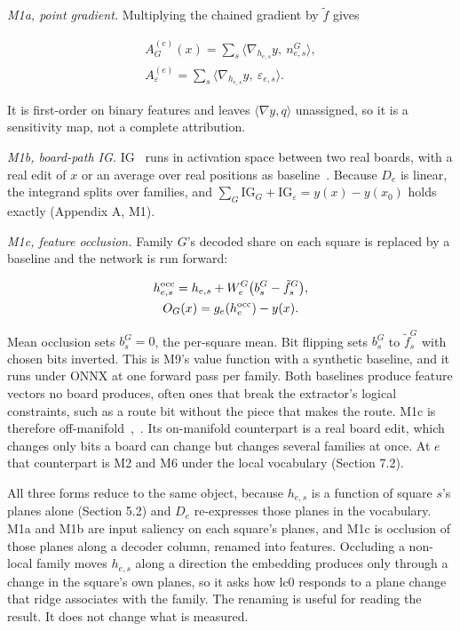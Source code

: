 \documentclass[conference]{IEEEtran}
\begin{document}
\emph{M1a, point gradient.} Multiplying the chained gradient by $\tilde f$ gives

\[
\begin{gathered}A^{(e)}_G(x)=\sum_s\big\langle\nabla_{h_{e,s}}y,\ n^G_{e,s}\big\rangle,\\
A^{(e)}_\varepsilon=\sum_s\big\langle\nabla_{h_{e,s}}y,\ \varepsilon_{e,s}\big\rangle.\end{gathered}
\]

It is first-order on binary features and leaves $\langle\nabla y,q\rangle$ unassigned, so it is a sensitivity map, not a complete attribution.

\emph{M1b, board-path IG.} IG~\cite{sundararajan2017} runs in activation space between two real boards, with a real edit of $x$ or an average over real positions as baseline~\cite{lundstrom2022}. Because $D_e$ is linear, the integrand splits over families, and $\sum_G\mathrm{IG}_G+\mathrm{IG}_\varepsilon=y(x)-y(x_0)$ holds exactly (Appendix A, M1).

\emph{M1c, feature occlusion.} Family $G$'s decoded share on each square is replaced by a baseline and the network is run forward:

\[
\begin{gathered}h^{\rm occ}_{e,s}=h_{e,s}+W^G_e\big(b^G_s-\tilde f^G_s\big),\\
O_G(x)=g_e(h^{\rm occ}_e)-y(x).\end{gathered}
\]

Mean occlusion sets $b^G_s=0$, the per-square mean. Bit flipping sets $b^G_s$ to $\tilde f^G_s$ with chosen bits inverted. This is M9's value function with a synthetic baseline, and it runs under ONNX at one forward pass per family. Both baselines produce feature vectors no board produces, often ones that break the extractor's logical constraints, such as a route bit without the piece that makes the route. M1c is therefore off-manifold~\cite{frye2021},~\cite{kumarIE2020}. Its on-manifold counterpart is a real board edit, which changes only bits a board can change but changes several families at once. At $e$ that counterpart is M2 and M6 under the local vocabulary (Section 7.2).

All three forms reduce to the same object, because $h_{e,s}$ is a function of square $s$'s planes alone (Section 5.2) and $D_e$ re-expresses those planes in the vocabulary. M1a and M1b are input saliency on each square's planes, and M1c is occlusion of those planes along a decoder column, renamed into features. Occluding a non-local family moves $h_{e,s}$ along a direction the embedding produces only through a change in the square's own planes, so it asks how lc0 responds to a plane change that ridge associates with the family. The renaming is useful for reading the result. It does not change what is measured.
\end{document}
